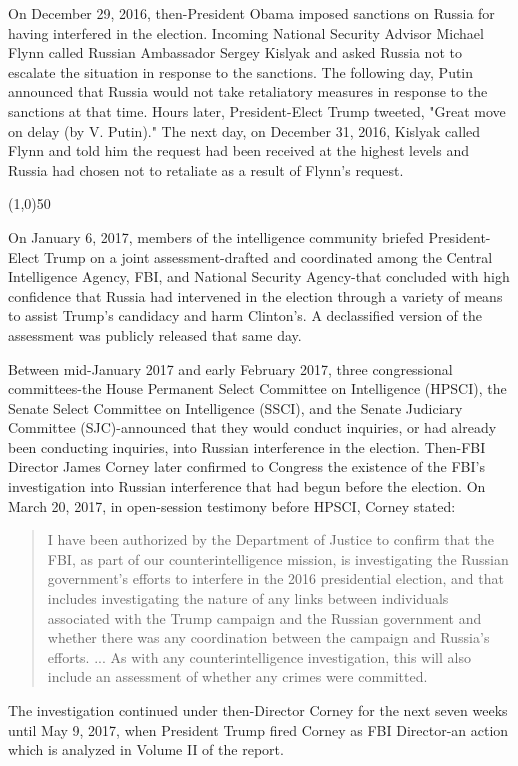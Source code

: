 \documentclass{article}
\newcommand{\hr}{\begin{center} \line(1,0){50} \end{center}}
\begin{document}
On December 29, 2016, then-President Obama imposed sanctions on Russia for having interfered in the election.
Incoming National Security Advisor Michael Flynn called Russian Ambassador Sergey Kislyak and asked Russia not to escalate the situation in response to the sanctions.
The following day, Putin announced that Russia would not take retaliatory measures in response to the sanctions at that time.
Hours later, President-Elect Trump tweeted, "Great move on delay (by V. Putin)."
The next day, on December 31, 2016, Kislyak called Flynn and told him the request had been received at the highest levels and Russia had chosen not to retaliate as a result of Flynn's request.

\hr

On January 6, 2017, members of the intelligence community briefed President-Elect Trump on a joint assessment-drafted and coordinated among the Central Intelligence Agency, FBI, and National Security Agency-that concluded with high confidence that Russia had intervened in the election through a variety of means to assist Trump's candidacy and harm Clinton's.
A declassified version of the assessment was publicly released that same day.

Between mid-January 2017 and early February 2017, three congressional committees-the House Permanent Select Committee on Intelligence (HPSCI), the Senate Select Committee on Intelligence (SSCI), and the Senate Judiciary Committee (SJC)-announced that they would conduct inquiries, or had already been conducting inquiries, into Russian interference in the election.
Then-FBI Director James Corney later confirmed to Congress the existence of the FBI's investigation into Russian interference that had begun before the election.
On March 20, 2017, in open-session testimony before HPSCI, Corney stated:

\begin{quote}
I have been authorized by the Department of Justice to confirm that the FBI, as part of our counterintelligence mission, is investigating the Russian government's efforts to interfere in the 2016 presidential election, and that includes investigating the nature of any links between individuals associated with the Trump campaign and the Russian government and whether there was any coordination between the campaign and Russia's efforts.
...
As with any counterintelligence investigation, this will also include an assessment of whether any crimes were committed.
\end{quote}

The investigation continued under then-Director Corney for the next seven weeks until May 9, 2017, when President Trump fired Corney as FBI Director-an action which is analyzed in Volume II of the report.
\end{document}
